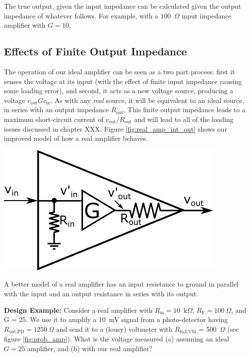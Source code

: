 \documentclass{tufte-book}
\begin{document}
The true output, given the input impedance can be calculated given the output impedance of whatever follows. For example, with a $100$~$\Omega$ input impedance amplifier with $G = 10$, 

\subsection{Effects of Finite Output Impedance}
The operation of our ideal amplifier can be seen as a two part process: first it senses the voltage at its input (with the effect of finite input impedance causing some loading error), and second, it acts as a new voltage source, producing a voltage $v_\text{out} Gc_\text{in}$. As with any \textit{real} source, it will be equivalent to an ideal source, in series with an output impedance $R_\text{out}$. This finite output impedance leads to a maximum short-circuit current of $v_\text{out}/R_\text{out}$ and will lead to all of the loading issues discussed in chapter XXX. Figure \ref{fig:real_amp_int_out} shows our improved model of how a real amplifier behaves.

\begin{marginfigure}%
  \includegraphics[width=\linewidth]{RealAmplifier_int_out}
  \caption{A better model of a real amplifier has an input resistance to ground in parallel with the input and an output resistance in series with its output.}
  \label{fig:real_amp_int_out}
\end{marginfigure}

\noindent\textbf{Design Example:} Consider a real amplifier with $R_\text{in} = 10$~k$\Omega$, $R_\text{F} = 100~\Omega$, and G = 25. We use it to amplify a 10~mV signal from a photo-detector having $R_\text{out,PD} = 1250~\Omega$ and send it to a (lousy) voltmeter with $R_\text{in,LVM}$ = 500~$\Omega$ (see figure \ref{fig:prob_amp}). What is the voltage measured (a) assuming an ideal $G = 25$ amplifier, and (b) with our real amplifier?
\end{document}
